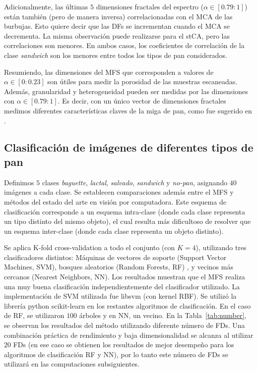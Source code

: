 Adicionalmente, las últimas $5$ dimensiones fractales  del espectro ($\alpha \in [0.79: 1]$) están también (pero de manera inversa) correlacionadas con el MCA de las burbujas.
Esto quiere decir que las DFs se incrementan cuando el MCA se decrementa.
La misma observación puede realizarse para el stCA, pero las correlaciones son menores.
En ambos casos, los coeficientes de correlación de la clase {\em sandwich} son los menores entre todos los tipos de pan considerados.

Resumiendo, las dimensiones del MFS que corresponden a valores de  $\alpha \in [0: 0.23]$ son útiles para medir la porosidad de las muestras escaneadas. Además, granularidad y heterogeneidad pueden ser medidas por las dimensiones con  $\alpha \in [0.79: 1]$.
Es decir, con un único vector de dimensiones fractales medimos diferentes características claves de la miga de pan, como fue sugerido en \cite{Gonzales2008}.

\subsection{Clasificaci\'on de imágenes de diferentes tipos de pan}

Definimos $5$ clases {\em baguette}, {\em lactal}, {\em salvado}, {\em sandwich} y {\em no-pan}, asignando $40$ imágenes a cada clase.  Se establecen comparaciones además entre el MFS y métodos del estado del arte en visión por computadora.
Este esquema de clasificación corresponde a un esquema intra-clase (donde cada clase representa un tipo distinto del mismo objeto), el cual resulta más dificultoso de resolver que un esquema inter-clase (donde cada clase representa un objeto distinto).

Se aplica K-fold cross-validation a todo el conjunto (con $K=4$), utilizando tres clasificadores distintos: Máquinas de vectores de soporte (Support Vector Machines, \acrshort{SVM}),  bosques aleatorios (Random Forests, \acrshort{RF}) \cite{Breiman2001}, y vecinos más cercanos (Nearest Neighbors, \acrshort{NN}).
Los resultados muestran que el MFS realiza una muy buena clasificación independientemente del clasificador utilizado.
La implementación de SVM utilizada fue \textsf{libsvm} \cite{Chang2011} (con kernel RBF).
Se utilizó la librería python \textsf{scikit-learn} en los restantes algoritmos de clasificación.
En el caso de RF, se utilizaron $100$ árboles y en NN, un vecino.
En la Tabla~\ref{tab:number}, se observan los resultados del método utilizando diferente número de FDs.
Una combinación práctica de rendimiento y baja dimensionalidad se alcanza al utilizar $20$ FDs (en ese caso se obtienen los resultados de mejor desempeño para los algoritmos de clasificación RF y NN), por lo tanto este número de FDs se utilizará en las computaciones subsiguientes.


